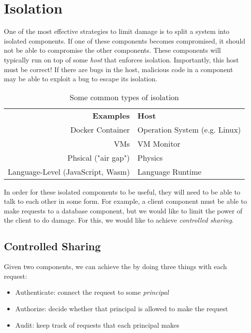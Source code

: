 \section{Isolation}
One of the most effective strategies to limit damage is to split a system into isolated components. If one of these components becomes compromised, it should not be able to compromise the other components. These components will typically run on top of some \emph{host} that enforces isolation. Importantly, this host must be correct! If there are bugs in the host, malicious code in a component may be able to exploit a bug to escape its isolation.

\begin{table}[htpb]
	\centering
	\caption{Some common types of isolation}
	\label{tab:isolationtypes}

	\begin{tabular}{rl}
		\textbf{Examples} & \textbf{Host} \\
		Docker Container & Operation System (e.g. Linux) \\
		VMs & VM Monitor \\
		Phsical ("air gap") & Physics \\
		Language-Level (JavaScript, Wasm) & Language Runtime \\
	\end{tabular}
\end{table}

In order for these isolated components to be useful, they will need to be able to talk to each other in some form. For example, a client component must be able to make requests to a database component, but we would like to limit the power of the client to do damage. For this, we would like to achieve \textit{controlled sharing}.

\subsection{Controlled Sharing}
Given two components, we can achieve the  by doing three things with each request:
\begin{itemize}
	\item Authenticate: connect the request to some \emph{principal}
	\item Authorize: decide whether that principal is allowed to make the request
	\item Audit: keep track of requests that each principal makes
\end{itemize}

